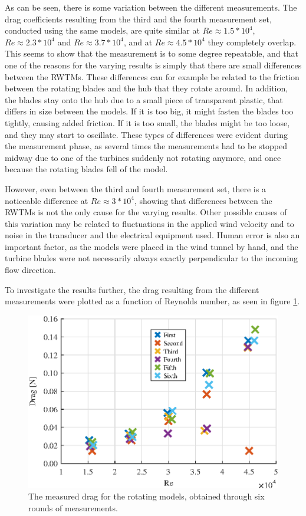 As can be seen, there is some variation between the different measurements. The drag coefficients resulting from the third and the fourth measurement set, conducted using the same models, are quite similar at $Re \approx 1.5*10^4$, $Re \approx 2.3*10^4$ and $Re \approx 3.7*10^4$, and at $Re \approx 4.5*10^4$ they completely overlap. This seems to show that the measurement is to some degree repeatable, and that one of the reasons for the varying results is simply that there are small differences between the \gls{RWTM}s. These differences can for example be related to the friction between the rotating blades and the hub that they rotate around. In addition, the blades stay onto the hub due to a small piece of transparent plastic, that differs in size between the models. If it is too big, it might fasten the blades too tightly, causing added friction. If it is too small, the blades might be too loose, and they may start to oscillate. These types of differences were evident during the measurement phase, as several times the measurements had to be stopped midway due to one of the turbines suddenly not rotating anymore, and once because the rotating blades fell of the model.  

However, even between the third and fourth measurement set, there is a noticeable difference at $Re \approx 3*10^4$, showing that differences between the \gls{RWTM}s is not the only cause for the varying results. Other possible causes of this variation may be related to fluctuations in the applied wind velocity and to noise in the transducer and the electrical equipment used. Human error is also an important factor, as the models were placed in the wind tunnel by hand, and the turbine blades were not necessarily always exactly perpendicular to the incoming flow direction.   

To investigate the results further, the drag resulting from the different measurements were plotted as a function of Reynolds number, as seen in figure \ref{fig:RotationalDrag}.


\begin{figure}
    \centering
    \includegraphics[width=0.8\linewidth]{0_Images/RotationalDragRe.eps}
    \caption[Drag for the rotating models.]{The measured drag for the rotating models, obtained through six rounds of measurements.}
    \label{fig:RotationalDrag}
\end{figure}

